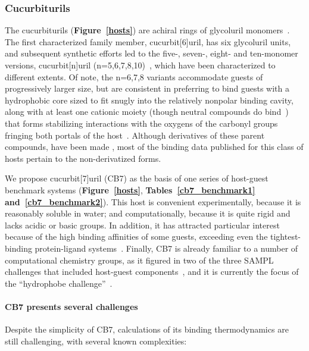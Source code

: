 \documentclass[aps,pre,twocolumn,nofootinbib,superscriptaddress,10pt, final,tightenlines]{revtex4-1}
\begin{document}
\subsubsection{Cucurbiturils}

The cucurbiturils ({\bf Figure~\ref{hosts}}) are achiral rings of glycoluril monomers~\cite{freeman_cucurbituril_1981}. The first characterized family member, cucurbit[6]uril, has six glycoluril units, and subsequent synthetic efforts led to the five-, seven-, eight- and ten-monomer versions, cucurbit[n]uril (n=5,6,7,8,10)~\cite{liu_cucurbituril_2005},
which have been characterized to different extents. 
Of note, the n=6,7,8 variants accommodate guests of progressively larger size, but are consistent in preferring to bind guests with a hydrophobic core sized to fit snugly into the relatively nonpolar binding cavity, along with at least one cationic moiety (though neutral compounds do bind~\cite{wyman_cucurbituril_2008, lee_deciphering_2015}) that forms stabilizing interactions with the oxygens of the carbonyl groups fringing both portals of the host~\cite{liu_cucurbituril_2005}. 
Although derivatives of these parent compounds, have been made \cite{lee_cucurbituril_2003, vinciguerra_synthesis_2015, assaf_cucurbiturils:_2015, cong_synthesis_2016},
most of the binding data published for this class of hosts pertain to the non-derivatized forms. 


We propose cucurbit[7]uril (CB7) as the basis of one series of host-guest benchmark systems ({\bf Figure~\ref{hosts}}, {\bf Tables~\ref{cb7_benchmark1} and~\ref{cb7_benchmark2}}). 
This host is convenient experimentally, because it is reasonably soluble in water; and computationally, because it is quite rigid and lacks acidic or basic groups. 
In addition, it has attracted particular interest because of the high binding affinities of some guests, exceeding even the tightest-binding protein-ligand systems~\cite{liu_cucurbituril_2005, rekharsky_synthetic_2007, moghaddam_hostguest_2009, cao_attomolar_2014}.  
Finally, CB7 is already familiar to a number of computational chemistry groups, as it figured in two of the three SAMPL challenges that included host-guest components~\cite{muddana_sampl3_2012, muddana_sampl4_2014}, and it is currently the focus of the ``hydrophobe challenge''~\cite{schreiner_theoretical_2016}. 
 
\paragraph{CB7 presents several challenges} Despite the simplicity of CB7, calculations of its binding thermodynamics are still challenging, with several known complexities:
\end{document}
